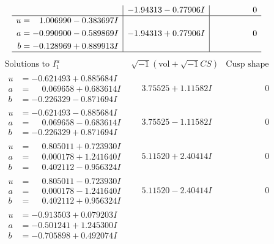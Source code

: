 \documentclass[1p]{elsarticle_modified}
\theoremstyle{definition}
\newcommand{\I}{\sqrt{-1}}
\begin{document}
$$\begin{array}{c|c|c}
 & -1.94313 - 0.77906 I & \phantom{-0.000000 } 0 \\ \hline\begin{aligned}
u &= \phantom{-}1.006990 - 0.383697 I \\
a &= -0.990900 - 0.589869 I \\
b &= -0.128969 + 0.889913 I\end{aligned}
 & -1.94313 + 0.77906 I & \phantom{-0.000000 } 0\\
 \hline 
 \end{array}$$\newpage$$\begin{array}{c|c|c}  
\text{Solutions to }I^u_{1}& \I (\text{vol} + \sqrt{-1}CS) & \text{Cusp shape}\\
 \hline 
\begin{aligned}
u &= -0.621493 + 0.885684 I \\
a &= \phantom{-}0.069658 + 0.683614 I \\
b &= -0.226329 - 0.871694 I\end{aligned}
 & \phantom{-}3.75525 + 1.11582 I & \phantom{-0.000000 } 0 \\ \hline\begin{aligned}
u &= -0.621493 - 0.885684 I \\
a &= \phantom{-}0.069658 - 0.683614 I \\
b &= -0.226329 + 0.871694 I\end{aligned}
 & \phantom{-}3.75525 - 1.11582 I & \phantom{-0.000000 } 0 \\ \hline\begin{aligned}
u &= \phantom{-}0.805011 + 0.723930 I \\
a &= \phantom{-}0.000178 + 1.241640 I \\
b &= \phantom{-}0.402112 - 0.956324 I\end{aligned}
 & \phantom{-}5.11520 + 2.40414 I & \phantom{-0.000000 } 0 \\ \hline\begin{aligned}
u &= \phantom{-}0.805011 - 0.723930 I \\
a &= \phantom{-}0.000178 - 1.241640 I \\
b &= \phantom{-}0.402112 + 0.956324 I\end{aligned}
 & \phantom{-}5.11520 - 2.40414 I & \phantom{-0.000000 } 0 \\ \hline\begin{aligned}
u &= -0.913503 + 0.079203 I \\
a &= -0.501241 + 1.245300 I \\
b &= -0.705898 + 0.492074 I\end{aligned}

\end{array}$$
\end{document}
